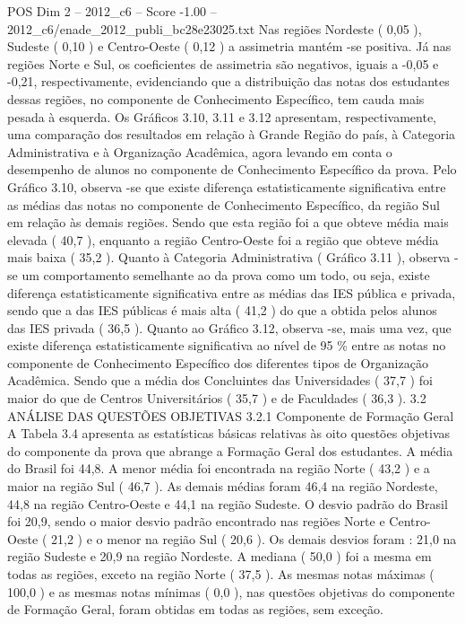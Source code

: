\begin{textsample}{POS Dim 2 – 2012\_c6 – Score -1.00 – 2012\_c6/enade\_2012\_publi\_bc28e23025.txt}
Nas regiões Nordeste ( 0,05 ), Sudeste ( 0,10 ) e Centro-Oeste ( 0,12 ) a assimetria mantém -se positiva.
Já nas regiões Norte e Sul, os coeficientes de assimetria são negativos, iguais a -0,05 e -0,21, respectivamente, evidenciando que a distribuição das notas dos estudantes dessas regiões, no componente de Conhecimento Específico, tem cauda mais pesada à esquerda.
Os Gráficos 3.10, 3.11 e 3.12 apresentam, respectivamente, uma comparação dos resultados em relação à Grande Região do país, à Categoria Administrativa e à Organização Acadêmica, agora levando em conta o desempenho de alunos no componente de Conhecimento Específico da prova.
Pelo Gráfico 3.10, observa -se que existe diferença estatisticamente significativa entre as médias das notas no componente de Conhecimento Específico, da região Sul em relação às demais regiões.
Sendo que esta região foi a que obteve média mais elevada ( 40,7 ), enquanto a região Centro-Oeste foi a região que obteve média mais baixa ( 35,2 ).
Quanto à Categoria Administrativa ( Gráfico 3.11 ), observa -se um comportamento semelhante ao da prova como um todo, ou seja, existe diferença estatisticamente significativa entre as médias das IES pública e privada, sendo que a das IES públicas é mais alta ( 41,2 ) do que a obtida pelos alunos das IES privada ( 36,5 ).
Quanto ao Gráfico 3.12, observa -se, mais uma vez, que existe diferença estatisticamente significativa ao nível de 95 \% entre as notas no componente de Conhecimento Específico dos diferentes tipos de Organização Acadêmica.
Sendo que a média dos Concluintes das Universidades ( 37,7 ) foi maior do que de Centros Universitários ( 35,7 ) e de Faculdades ( 36,3 ). 3.2 ANÁLISE DAS QUESTÕES OBJETIVAS 3.2.1 Componente de Formação Geral A Tabela 3.4 apresenta as estatísticas básicas relativas às oito questões objetivas do componente da prova que abrange a Formação Geral dos estudantes.
A média do Brasil foi 44,8.
A menor média foi encontrada na região Norte ( 43,2 ) e a maior na região Sul ( 46,7 ).
As demais médias foram 46,4 na região Nordeste, 44,8 na região Centro-Oeste e 44,1 na região Sudeste.
O desvio padrão do Brasil foi 20,9, sendo o maior desvio padrão encontrado nas regiões Norte e Centro-Oeste ( 21,2 ) e o menor na região Sul ( 20,6 ).
Os demais desvios foram : 21,0 na região Sudeste e 20,9 na região Nordeste.
A mediana ( 50,0 ) foi a mesma em todas as regiões, exceto na região Norte ( 37,5 ).
As mesmas notas máximas ( 100,0 ) e as mesmas notas mínimas ( 0,0 ), nas questões objetivas do componente de Formação Geral, foram obtidas em todas as regiões, sem exceção.

\end{textsample}
